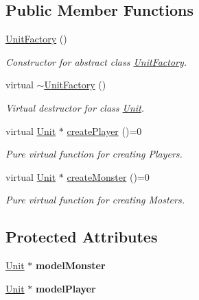 \subsection*{Public Member Functions}
\begin{DoxyCompactItemize}
\item 
\hypertarget{class_unit_factory_a80d72d19128bfb2adb7580405bf058af}{}\hyperlink{class_unit_factory_a80d72d19128bfb2adb7580405bf058af}{Unit\+Factory} ()\label{class_unit_factory_a80d72d19128bfb2adb7580405bf058af}

\begin{DoxyCompactList}\small\item\em Constructor for abstract class \hyperlink{class_unit_factory}{Unit\+Factory}. \end{DoxyCompactList}\item 
\hypertarget{class_unit_factory_a711fba8252a25f2c3b146c48467de0f4}{}virtual \hyperlink{class_unit_factory_a711fba8252a25f2c3b146c48467de0f4}{$\sim$\+Unit\+Factory} ()\label{class_unit_factory_a711fba8252a25f2c3b146c48467de0f4}

\begin{DoxyCompactList}\small\item\em Virtual destructor for class \hyperlink{class_unit}{Unit}. \end{DoxyCompactList}\item 
virtual \hyperlink{class_unit}{Unit} $\ast$ \hyperlink{class_unit_factory_ad0c4ed547dcb38f6176a660850d405c6}{create\+Player} ()=0
\begin{DoxyCompactList}\small\item\em Pure virtual function for creating Players. \end{DoxyCompactList}\item 
virtual \hyperlink{class_unit}{Unit} $\ast$ \hyperlink{class_unit_factory_a5c34317957c2500e571dae72bcb0ef3e}{create\+Monster} ()=0
\begin{DoxyCompactList}\small\item\em Pure virtual function for creating Mosters. \end{DoxyCompactList}\end{DoxyCompactItemize}
\subsection*{Protected Attributes}
\begin{DoxyCompactItemize}
\item 
\hypertarget{class_unit_factory_afe9836096c4bb82810b34853274b28fd}{}\hyperlink{class_unit}{Unit} $\ast$ {\bfseries model\+Monster}\label{class_unit_factory_afe9836096c4bb82810b34853274b28fd}

\item 
\hypertarget{class_unit_factory_a80786fa16035fcdfa88762a8fc04f751}{}\hyperlink{class_unit}{Unit} $\ast$ {\bfseries model\+Player}\label{class_unit_factory_a80786fa16035fcdfa88762a8fc04f751}

\end{DoxyCompactItemize}


